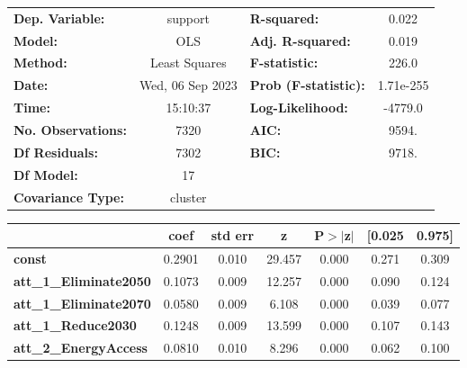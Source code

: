 \begin{center}
\begin{tabular}{lclc}
\toprule
\textbf{Dep. Variable:}              &     support      & \textbf{  R-squared:         } &     0.022   \\
\textbf{Model:}                      &       OLS        & \textbf{  Adj. R-squared:    } &     0.019   \\
\textbf{Method:}                     &  Least Squares   & \textbf{  F-statistic:       } &     226.0   \\
\textbf{Date:}                       & Wed, 06 Sep 2023 & \textbf{  Prob (F-statistic):} & 1.71e-255   \\
\textbf{Time:}                       &     15:10:37     & \textbf{  Log-Likelihood:    } &   -4779.0   \\
\textbf{No. Observations:}           &        7320      & \textbf{  AIC:               } &     9594.   \\
\textbf{Df Residuals:}               &        7302      & \textbf{  BIC:               } &     9718.   \\
\textbf{Df Model:}                   &          17      & \textbf{                     } &             \\
\textbf{Covariance Type:}            &     cluster      & \textbf{                     } &             \\
\bottomrule
\end{tabular}
\begin{tabular}{lcccccc}
                                     & \textbf{coef} & \textbf{std err} & \textbf{z} & \textbf{P$> |$z$|$} & \textbf{[0.025} & \textbf{0.975]}  \\
\midrule
\textbf{const}                       &       0.2901  &        0.010     &    29.457  &         0.000        &        0.271    &        0.309     \\
\textbf{att\_1\_Eliminate2050}       &       0.1073  &        0.009     &    12.257  &         0.000        &        0.090    &        0.124     \\
\textbf{att\_1\_Eliminate2070}       &       0.0580  &        0.009     &     6.108  &         0.000        &        0.039    &        0.077     \\
\textbf{att\_1\_Reduce2030}          &       0.1248  &        0.009     &    13.599  &         0.000        &        0.107    &        0.143     \\
\textbf{att\_2\_EnergyAccess}        &       0.0810  &        0.010     &     8.296  &         0.000        &        0.062    &        0.100     \\

\end{tabular}
\end{center}
